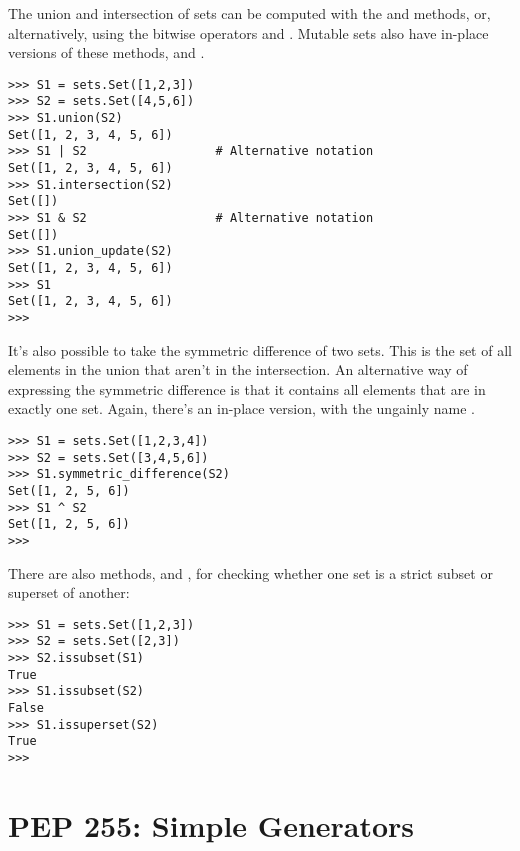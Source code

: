 \documentclass{howto}
\begin{document}
The union and intersection of sets can be computed with the
 and  methods, or,
alternatively, using the bitwise operators \code{\&} and \code{|}.
Mutable sets also have in-place versions of these methods,
 and .

\begin{verbatim}
>>> S1 = sets.Set([1,2,3])
>>> S2 = sets.Set([4,5,6])
>>> S1.union(S2)
Set([1, 2, 3, 4, 5, 6])
>>> S1 | S2                  # Alternative notation
Set([1, 2, 3, 4, 5, 6])
>>> S1.intersection(S2)
Set([])
>>> S1 & S2                  # Alternative notation
Set([])
>>> S1.union_update(S2)
Set([1, 2, 3, 4, 5, 6])
>>> S1
Set([1, 2, 3, 4, 5, 6])
>>>
\end{verbatim}

It's also possible to take the symmetric difference of two sets.  This
is the set of all elements in the union that aren't in the
intersection.  An alternative way of expressing the symmetric
difference is that it contains all elements that are in exactly one
set.  Again, there's an in-place version, with the ungainly name
.

\begin{verbatim}
>>> S1 = sets.Set([1,2,3,4])
>>> S2 = sets.Set([3,4,5,6])
>>> S1.symmetric_difference(S2)
Set([1, 2, 5, 6])
>>> S1 ^ S2
Set([1, 2, 5, 6])
>>>
\end{verbatim}

There are also methods,  and ,
for checking whether one set is a strict subset or superset of
another:

\begin{verbatim}
>>> S1 = sets.Set([1,2,3])
>>> S2 = sets.Set([2,3])
>>> S2.issubset(S1)
True
>>> S1.issubset(S2)
False
>>> S1.issuperset(S2)
True
>>>
\end{verbatim}


\begin{seealso}


\end{seealso}



\section{PEP 255: Simple Generators\label{section-generators}}
\end{document}
